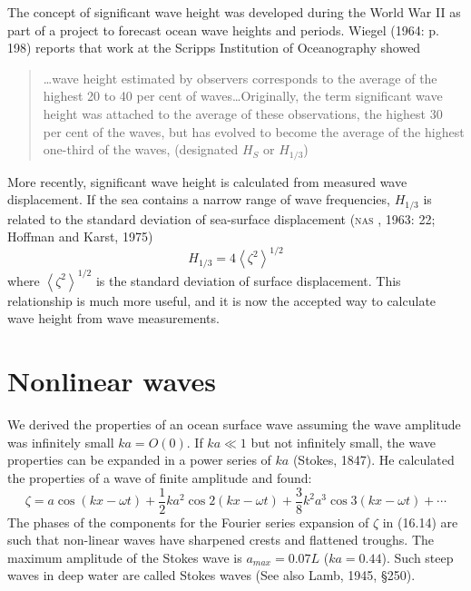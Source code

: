 The concept of significant wave height was developed during the World War II
as part of a project to forecast ocean wave heights and periods. Wiegel (1964: p.
198) reports that work at the Scripps Institution of Oceanography showed
\begin{quote} \small
\ldots wave height estimated by observers corresponds to the average of the highest
20 to 40 per cent of waves\ldots Originally, the term significant wave height was
attached to the average of these observations, the highest 30 per cent of the
waves, but has evolved to become the average of the highest one-third of the waves,
(designated $H_S$ or $H_{1/3}$)
\end{quote}

More recently, significant wave height is calculated from measured wave
displacement. If the sea contains a narrow range of wave frequencies, $H_{1/3}$ is
related to the standard deviation of sea-surface displacement (\textsc{nas} , 1963:
22; Hoffman and Karst, 1975)
\begin{equation}
H_{1/3} = 4 \left< \zeta ^{2}\right>^{1/2}
\end{equation}
where $ \left< \zeta ^{2}\right>^{1/2}$ is the standard deviation of surface
displacement. This relationship is much more useful, and it is now the accepted
way to calculate wave height from wave measurements.

\section{Nonlinear waves}
We derived the properties of an ocean surface wave assuming the wave
amplitude was infinitely small $ka = O(0)$. If $ka \ll 1$ but not
infinitely small, the wave properties can be expanded in a power series of $ka$ (Stokes,
1847). He calculated the properties of a wave of finite amplitude and found:
\begin{equation}
\zeta = a \cos(kx - \omega t) + \frac{1}{2} k a^{2}\cos 2(kx-\omega t) +
\frac{3}{8} k^{2} a^{3} \cos 3(k x - \omega t) + \cdots
\end{equation}
The phases of the components for the Fourier series expansion of $\zeta$ in
(16.14) are such that non-linear waves have sharpened crests and flattened
troughs. The maximum amplitude of the Stokes wave is $a_{max} = 0.07 L$ ($ ka =
0.44$). Such steep waves in deep water are called Stokes waves (See also Lamb, 1945,
\S 250).


